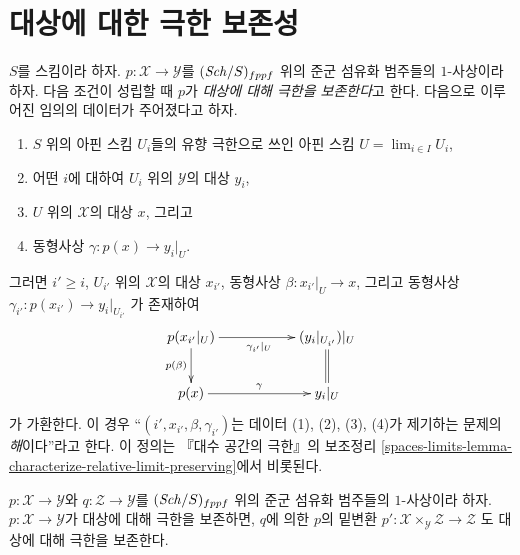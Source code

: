 \section{대상에 대한 극한 보존성}
\label{section-limit-preserving}

\noindent
$S$를 스킴이라 하자. $p : \mathcal{X} \to \mathcal{Y}$를
$(\mathit{Sch}/S)_{fppf}$ 위의 준군 섬유화 범주들의 $1$-사상이라 하자.
다음 조건이 성립할 때 $p$가 {\it 대상에 대해 극한을 보존한다}고 한다.
다음으로 이루어진 임의의 데이터가 주어졌다고 하자.
\begin{enumerate}
\item $S$ 위의 아핀 스킴 $U_i$들의 유향 극한으로 쓰인 아핀 스킴
$U = \lim_{i \in I} U_i$,
\item 어떤 $i$에 대하여 $U_i$ 위의 $\mathcal{Y}$의 대상 $y_i$,
\item $U$ 위의 $\mathcal{X}$의 대상 $x$, 그리고
\item 동형사상 $\gamma : p(x) \to y_i|_U$.
\end{enumerate}
그러면 $i' \geq i$, $U_{i'}$ 위의 $\mathcal{X}$의 대상 $x_{i'}$,
동형사상 $\beta : x_{i'}|_U \to x$, 그리고 동형사상
$\gamma_{i'} : p(x_{i'}) \to y_i|_{U_{i'}}$
가 존재하여
\begin{equation}
\label{equation-limit-preserving}
\vcenter{
\xymatrix{
p(x_{i'}|_U) \ar[d]_{p(\beta)} \ar[rr]_{\gamma_{i'}|_U} & &
(y_i|_{U_{i'}})|_U \ar@{=}[d] \\
p(x) \ar[rr]^\gamma & & y_i|_U
}
}
\end{equation}
가 가환한다. 이 경우 “$(i', x_{i'}, \beta, \gamma_{i'})$는
데이터 (1), (2), (3), (4)가 제기하는 문제의 {\it 해}이다”라고 한다.
이 정의는 『대수 공간의 극한』의 보조정리
\ref{spaces-limits-lemma-characterize-relative-limit-preserving}에서 비롯된다.

\begin{lemma}
\label{lemma-base-change-limit-preserving}
$p : \mathcal{X} \to \mathcal{Y}$와 $q : \mathcal{Z} \to \mathcal{Y}$를
$(\mathit{Sch}/S)_{fppf}$ 위의 준군 섬유화 범주들의 $1$-사상이라 하자.
$p : \mathcal{X} \to \mathcal{Y}$가 대상에 대해 극한을 보존하면,
$q$에 의한 $p$의 밑변환
$p' : \mathcal{X} \times_\mathcal{Y} \mathcal{Z} \to \mathcal{Z}$
도 대상에 대해 극한을 보존한다.
\end{lemma}

